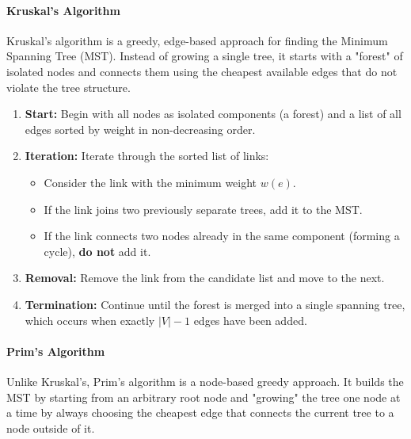 \paragraph{Kruskal's Algorithm}
Kruskal's algorithm is a greedy, edge-based approach for finding the Minimum Spanning Tree (MST). Instead of growing a single tree, it starts with a "forest" of isolated nodes and connects them using the cheapest available edges that do not violate the tree structure.

\begin{enumerate}
    \item \textbf{Start:} Begin with all nodes as isolated components (a forest) and a list of all edges sorted by weight in non-decreasing order.
    \item \textbf{Iteration:} Iterate through the sorted list of links:
          \begin{itemize}
              \item Consider the link with the minimum weight \( w(e) \).
              \item If the link joins two previously separate trees, add it to the MST.
              \item If the link connects two nodes already in the same component (forming a cycle), \textbf{do not} add it.
          \end{itemize}
    \item \textbf{Removal:} Remove the link from the candidate list and move to the next.
    \item \textbf{Termination:} Continue until the forest is merged into a single spanning tree, which occurs when exactly \( |V|-1 \) edges have been added.
\end{enumerate}

\paragraph{Prim's Algorithm}
Unlike Kruskal's, Prim's algorithm is a node-based greedy approach. It builds the MST by starting from an arbitrary root node and "growing" the tree one node at a time by always choosing the cheapest edge that connects the current tree to a node outside of it.

